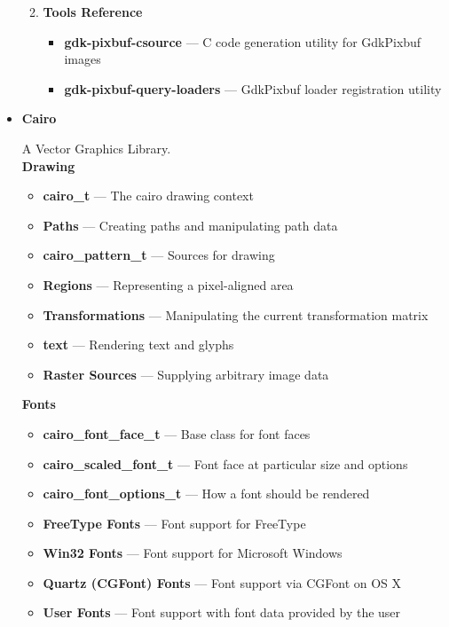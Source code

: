 \documentclass[12pt]{article}
\begin{document}
\begin{itemize}
\begin{enumerate}[I]
\begin{itemize}
\end{itemize}

\item \textbf{Tools Reference}

\begin{itemize}

\item \textbf{gdk-pixbuf-csource} — C code generation utility for GdkPixbuf images
\item \textbf{gdk-pixbuf-query-loaders} — GdkPixbuf loader registration utility


\end{itemize}

\end{enumerate}

\item \textbf{Cairo}

A Vector Graphics Library.\\

\textbf{Drawing}

\begin{itemize}

\item \textbf{cairo\_t} — The cairo drawing context
\item \textbf{Paths} — Creating paths and manipulating path data
\item \textbf{cairo\_pattern\_t} — Sources for drawing
\item \textbf{Regions} — Representing a pixel-aligned area
\item \textbf{Transformations} — Manipulating the current transformation matrix
\item \textbf{text} — Rendering text and glyphs
\item \textbf{Raster Sources} — Supplying arbitrary image data



\end{itemize}



\textbf{Fonts}

\begin{itemize}

\item \textbf{cairo\_font\_face\_t} — Base class for font faces
\item \textbf{cairo\_scaled\_font\_t} — Font face at particular size and options
\item \textbf{cairo\_font\_options\_t} — How a font should be rendered
\item \textbf{FreeType Fonts} — Font support for FreeType
\item \textbf{Win32 Fonts} — Font support for Microsoft Windows
\item \textbf{Quartz (CGFont) Fonts} — Font support via CGFont on OS X
\item \textbf{User Fonts} — Font support with font data provided by the user




\end{itemize}
\end{itemize}
\end{document}
